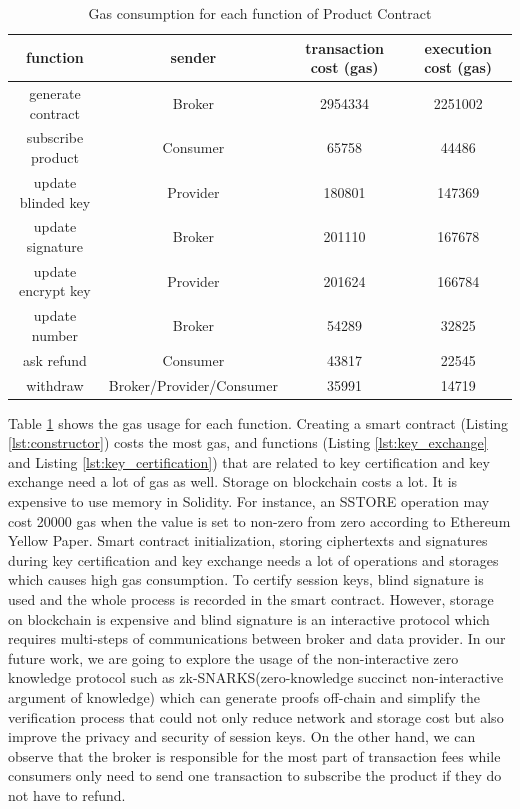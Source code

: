 \documentclass[journal,article,applsci,submit,moreauthors,pdftex]{Definitions/mdpi}
\begin{document}
\begin{table}[H]
	\caption{Gas consumption for each function of Product Contract}
	\centering
	\label{tab:gas}
	\begin{tabular}{cccc}
		\toprule
		\textbf{function} & \textbf{sender} & \textbf{transaction cost (gas)} & \textbf{execution cost (gas)} \\
		\midrule
		generate contract & Broker & 2954334 & 2251002 \\
		subscribe product & Consumer & 65758 & 44486 \\
		update blinded key & Provider & 180801 & 147369 \\
		update signature & Broker & 201110 & 167678 \\
		update encrypt key & Provider & 201624 & 166784 \\
		update number & Broker & 54289 & 32825 \\
		ask refund & Consumer & 43817 & 22545 \\
		withdraw & Broker/Provider/Consumer & 35991 & 14719 \\
		\bottomrule
	\end{tabular}
\end{table}

Table \ref{tab:gas} shows the gas usage for each function. Creating a smart contract (Listing \ref{lst:constructor}) costs the most gas, and functions (Listing \ref{lst:key_exchange} and Listing \ref{lst:key_certification}) that are related to key certification and key exchange need a lot of gas as well. Storage on blockchain costs a lot. It is expensive to use memory in Solidity. For instance, an SSTORE operation may cost 20000 gas when the value is set to non-zero from zero according to Ethereum Yellow Paper\cite{Ethereum}. Smart contract initialization, storing ciphertexts and signatures during key certification and key exchange needs a lot of operations and storages which causes high gas consumption. To certify session keys, blind signature is used and the whole process is recorded in the smart contract. However, storage on blockchain is expensive and blind signature is an interactive protocol which requires multi-steps of communications between broker and data provider. In our future work, we are going to explore the usage of the non-interactive zero knowledge protocol such as zk-SNARKS(zero-knowledge succinct non-interactive argument of knowledge)\cite{Snark} which can generate proofs off-chain and simplify the verification process that could not only reduce network and storage cost but also improve the privacy and security of session keys. On the other hand, we can observe that the broker is responsible for the most part of transaction fees while consumers only need to send one transaction to subscribe the product if they do not have to refund.
\end{document}
